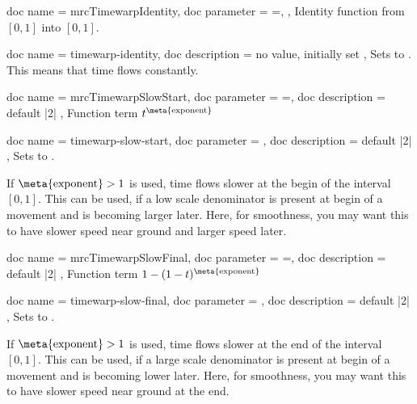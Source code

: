 \begin{docCommands}[
    doc new     = 2023-07-31,
  ]{
    {
      doc name        = mrcTimewarpIdentity,
      doc parameter   = {=},
    },
  }
  Identity function from \mbox{$[0,1]$} into \mbox{$[0,1]$}.
\end{docCommands}


\begin{docMrcKeys}[
    doc keypath = anim,
    doc new     = 2023-07-31,
  ]{
    {
      doc name        = timewarp-identity,
      doc description = {no value, initially set}
    },
  }
  Sets  to .
  This means that time flows constantly.
\end{docMrcKeys}


\begin{docCommands}[
    doc new     = 2023-07-31,
  ]{
    {
      doc name        = mrcTimewarpSlowStart,
      doc parameter   = {=},
      doc description = {default |2|}
    },
  }
  Function term $t^{\text{\meta{exponent}}}$
\end{docCommands}


\begin{docMrcKeys}[
    doc keypath = anim,
    doc new     = 2023-07-31,
  ]{
    {
      doc name        = timewarp-slow-start,
      doc parameter   = ,
      doc description = {default |2|}
    },
  }
  Sets  to .
  \par
  If $\text{\meta{exponent}}>1$ is used, time flows slower at the begin of the
  interval \mbox{$[0,1]$}. This can be used, if a low scale denominator is
  present at begin of a movement and is becoming larger later. Here, for smoothness,
  you may want this to have slower speed near ground and larger speed later.
\end{docMrcKeys}


\begin{docCommands}[
    doc new     = 2023-07-31,
  ]{
    {
      doc name        = mrcTimewarpSlowFinal,
      doc parameter   = {=},
      doc description = {default |2|}
    },
  }
  Function term $1 - (1-t)^{\text{\meta{exponent}}}$
\end{docCommands}


\begin{docMrcKeys}[
    doc keypath = anim,
    doc new     = 2023-07-31,
  ]{
    {
      doc name        = timewarp-slow-final,
      doc parameter   = ,
      doc description = {default |2|}
    },
  }
  Sets  to .
  \par
  If $\text{\meta{exponent}}>1$ is used, time flows slower at the end of the
  interval \mbox{$[0,1]$}. This can be used, if a large scale denominator is
  present at begin of a movement and is becoming lower later. Here, for smoothness,
  you may want this to have slower speed near ground at the end.
\end{docMrcKeys}


